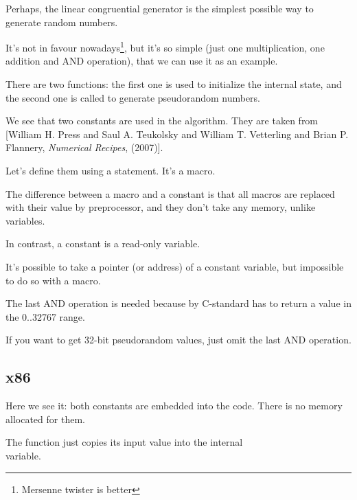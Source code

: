 \label{LCG_simple}

Perhaps, the linear congruential generator is the simplest possible way to generate random numbers.

It's not in favour nowadays\footnote{Mersenne twister is better}, but it's so simple 
(just one multiplication, one addition and AND operation), 
that we can use it as an example.



There are two functions: the first one is used to initialize the internal state, and the second one is called
to generate pseudorandom numbers.

We see that two constants are used in the algorithm.
They are taken from
[William H. Press and Saul A. Teukolsky and William T. Vetterling and Brian P. Flannery, \emph{Numerical Recipes}, (2007)].

Let's define them using a  \CCpp statement. It's a macro.

The difference between a \CCpp macro and a constant is that all macros are replaced 
with their value by \CCpp preprocessor,
and they don't take any memory, unlike variables.

In contrast, a constant is a read-only variable.

It's possible to take a pointer (or address) of a constant variable, but impossible to do so with a macro.

The last AND operation is needed because by C-standard  has to return a value in 
the 0..32767 range.

If you want to get 32-bit pseudorandom values, just omit the last AND operation.

\subsection{x86}



Here we see it: both constants are embedded into the code.
There is no memory allocated for them.

The  function just copies its input value into the internal\\
 variable.

